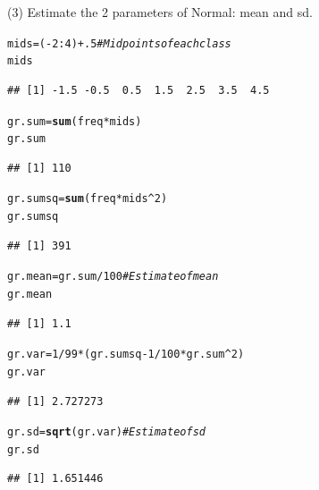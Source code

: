 \documentclass[t,xcolor=pdftex,dvipsnames,table]{beamer}
\makeatletter
\newcommand{\hlnum}[1]{\textcolor[rgb]{0.686,0.059,0.569}{#1}}%
\newcommand{\hlcom}[1]{\textcolor[rgb]{0.678,0.584,0.686}{\textit{#1}}}%
\newcommand{\hlopt}[1]{\textcolor[rgb]{0,0,0}{#1}}%
\newcommand{\hlstd}[1]{\textcolor[rgb]{0.345,0.345,0.345}{#1}}%
\newcommand{\hlkwb}[1]{\textcolor[rgb]{0.69,0.353,0.396}{#1}}%
\newcommand{\hlkwd}[1]{\textcolor[rgb]{0.737,0.353,0.396}{\textbf{#1}}}%
\newenvironment{kframe}{%
 \def\at@end@of@kframe{}%
 \ifinner\ifhmode%
  \def\at@end@of@kframe{\end{minipage}}%
  \begin{minipage}{\columnwidth}%
 \fi\fi%
 \def\FrameCommand##1{\hskip\@totalleftmargin \hskip-\fboxsep
 \colorbox{shadecolor}{##1}\hskip-\fboxsep
     \hskip-\linewidth \hskip-\@totalleftmargin \hskip\columnwidth}%
 \MakeFramed {\advance\hsize-\width
   \@totalleftmargin\z@ \linewidth\hsize
   \@setminipage}}%
 {\par\unskip\endMakeFramed%
 \at@end@of@kframe}
\newenvironment{knitrout}{}{} %
\makeatother
\begin{document}
\begin{frame}[fragile]{}
(3) Estimate the 2 parameters of Normal: mean and sd.
\begin{knitrout}
\color{fgcolor}\begin{kframe}
\begin{alltt}
\hlstd{mids}\hlkwb{=}\hlstd{(}\hlopt{-}\hlnum{2}\hlopt{:}\hlnum{4}\hlstd{)}\hlopt{+}\hlnum{.5}    \hlcom{#Midpoints of each class}
\hlstd{mids}
\end{alltt}
\begin{verbatim}
## [1] -1.5 -0.5  0.5  1.5  2.5  3.5  4.5
\end{verbatim}
\begin{alltt}
\hlstd{gr.sum}\hlkwb{=}\hlkwd{sum}\hlstd{(freq}\hlopt{*}\hlstd{mids)}
\hlstd{gr.sum}
\end{alltt}
\begin{verbatim}
## [1] 110
\end{verbatim}
\begin{alltt}
\hlstd{gr.sumsq}\hlkwb{=}\hlkwd{sum}\hlstd{(freq}\hlopt{*}\hlstd{mids}\hlopt{^}\hlnum{2}\hlstd{)}
\hlstd{gr.sumsq}
\end{alltt}
\begin{verbatim}
## [1] 391
\end{verbatim}
\end{kframe}
\end{knitrout}
\end{frame}

\begin{frame}[fragile]{}
\begin{knitrout}
\color{fgcolor}\begin{kframe}
\begin{alltt}
\hlstd{gr.mean}\hlkwb{=}\hlstd{gr.sum}\hlopt{/}\hlnum{100}   \hlcom{#Estimate of mean}
\hlstd{gr.mean}
\end{alltt}
\begin{verbatim}
## [1] 1.1
\end{verbatim}
\begin{alltt}
\hlstd{gr.var}\hlkwb{=}\hlnum{1}\hlopt{/}\hlnum{99}\hlopt{*} \hlstd{(gr.sumsq} \hlopt{-} \hlnum{1}\hlopt{/}\hlnum{100}\hlopt{*} \hlstd{gr.sum}\hlopt{^}\hlnum{2}\hlstd{)}
\hlstd{gr.var}
\end{alltt}
\begin{verbatim}
## [1] 2.727273
\end{verbatim}
\begin{alltt}
\hlstd{gr.sd}\hlkwb{=}\hlkwd{sqrt}\hlstd{(gr.var)}   \hlcom{#Estimate of sd}
\hlstd{gr.sd}
\end{alltt}
\begin{verbatim}
## [1] 1.651446
\end{verbatim}
\end{kframe}
\end{knitrout}
\end{frame}
\end{document}

